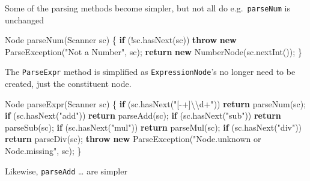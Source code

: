 \documentclass[
]{book}
\newenvironment{Shaded}{\begin{snugshade}}{\end{snugshade}}
\newcommand{\BuiltInTok}[1]{#1}
\newcommand{\FunctionTok}[1]{\textcolor[rgb]{0.00,0.00,0.00}{#1}}
\newcommand{\KeywordTok}[1]{\textcolor[rgb]{0.13,0.29,0.53}{\textbf{#1}}}
\newcommand{\NormalTok}[1]{#1}
\newcommand{\SpecialCharTok}[1]{\textcolor[rgb]{0.00,0.00,0.00}{#1}}
\newcommand{\StringTok}[1]{\textcolor[rgb]{0.31,0.60,0.02}{#1}}
\begin{document}
Some of the parsing methods become simpler, but not all do e.g.~\texttt{parseNum} is unchanged

\begin{Shaded}
\begin{Highlighting}[]
\BuiltInTok{Node} \FunctionTok{parseNum}\NormalTok{(}\BuiltInTok{Scanner}\NormalTok{ sc) \{}
  \KeywordTok{if}\NormalTok{ (!sc.}\FunctionTok{hasNext}\NormalTok{(sc)) }
    \KeywordTok{throw} \KeywordTok{new} \BuiltInTok{ParseException}\NormalTok{(}\StringTok{"Not a Number"}\NormalTok{, sc);}
  \KeywordTok{return} \KeywordTok{new} \FunctionTok{NumberNode}\NormalTok{(sc.}\FunctionTok{nextInt}\NormalTok{());}
\NormalTok{\}}
\end{Highlighting}
\end{Shaded}

The \texttt{ParseExpr} method is simplified as \texttt{ExpressionNode}'s no longer need to be created, just the constituent node.

\begin{Shaded}
\begin{Highlighting}[]
\BuiltInTok{Node} \FunctionTok{parseExpr}\NormalTok{(}\BuiltInTok{Scanner}\NormalTok{ sc) \{}
  \KeywordTok{if}\NormalTok{ (sc.}\FunctionTok{hasNext}\NormalTok{(}\StringTok{"[{-}+]}\SpecialCharTok{\textbackslash{}\textbackslash{}}\StringTok{d+"}\NormalTok{)) }
    \KeywordTok{return} \FunctionTok{parseNum}\NormalTok{(sc);}
  \KeywordTok{if}\NormalTok{ (sc.}\FunctionTok{hasNext}\NormalTok{(}\StringTok{"add"}\NormalTok{))}
    \KeywordTok{return} \FunctionTok{parseAdd}\NormalTok{(sc);}
  \KeywordTok{if}\NormalTok{ (sc.}\FunctionTok{hasNext}\NormalTok{(}\StringTok{"sub"}\NormalTok{))}
    \KeywordTok{return} \FunctionTok{parseSub}\NormalTok{(sc);}
  \KeywordTok{if}\NormalTok{ (sc.}\FunctionTok{hasNext}\NormalTok{(}\StringTok{"mul"}\NormalTok{))}
    \KeywordTok{return} \FunctionTok{parseMul}\NormalTok{(sc);}
  \KeywordTok{if}\NormalTok{ (sc.}\FunctionTok{hasNext}\NormalTok{(}\StringTok{"div"}\NormalTok{))}
    \KeywordTok{return} \FunctionTok{parseDiv}\NormalTok{(sc);}
  \KeywordTok{throw} \KeywordTok{new} \BuiltInTok{ParseException}\NormalTok{(}\StringTok{"Node.unknown or Node.missing"}\NormalTok{, sc);}
\NormalTok{\}}
\end{Highlighting}
\end{Shaded}

Likewise, \texttt{parseAdd} \ldots{} are simpler
\end{document}
